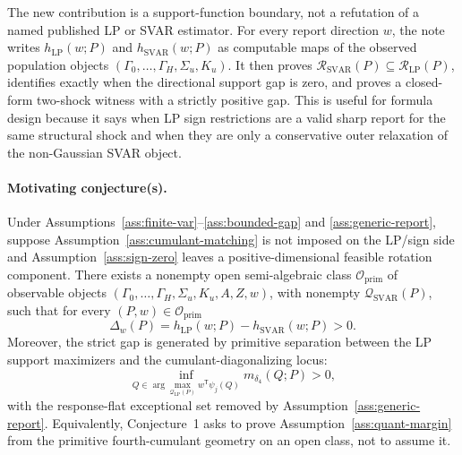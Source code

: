 \documentclass[11pt]{article}
\newcommand{\transpose}{\mathsf{T}}
\theoremstyle{definition}
\theoremstyle{plain}
\theoremstyle{remark}
\begin{document}
The new contribution is a support-function boundary, not a refutation of a
named published LP or SVAR estimator.  For every report
direction \(w\), the note writes \(h_{\mathrm{LP}}(w;P)\) and
\(h_{\mathrm{SVAR}}(w;P)\) as computable maps of the observed population
objects \((\Gamma_0,\ldots,\Gamma_H,\Sigma_u,K_u)\).  It then proves
\(\mathcal R_{\mathrm{SVAR}}(P)\subseteq \mathcal R_{\mathrm{LP}}(P)\),
identifies exactly when the directional support gap is zero, and proves a
closed-form two-shock witness with a strictly positive gap.  This is useful for
formula design because it says when LP sign restrictions are a valid sharp
report for the same structural shock and when they are only a conservative
outer relaxation of the non-Gaussian SVAR object.

\paragraph{Motivating conjecture(s).}
\begin{conjecture}\label{conj:primitive-strict-gap}
Under Assumptions~\ref{ass:finite-var}--\ref{ass:bounded-gap} and \ref{ass:generic-report}, suppose Assumption~\ref{ass:cumulant-matching} is not imposed on the LP/sign side and Assumption~\ref{ass:sign-zero} leaves a positive-dimensional feasible rotation component.  There exists a nonempty open semi-algebraic class \(\mathcal O_{\mathrm{prim}}\) of observable objects \((\Gamma_0,\ldots,\Gamma_H,\Sigma_u,K_u,A,Z,w)\), with nonempty \(\mathcal Q_{\mathrm{SVAR}}(P)\), such that for every \((P,w)\in\mathcal O_{\mathrm{prim}}\)
\[
\Delta_w(P)=h_{\mathrm{LP}}(w;P)-h_{\mathrm{SVAR}}(w;P)>0.
\]
Moreover, the strict gap is generated by primitive separation between the LP support maximizers and the cumulant-diagonalizing locus:
\[
\inf_{Q\in\arg\max_{\mathcal Q_{\mathrm{LP}}(P)} w^\transpose\psi_j(Q)}
m_{\delta_4}(Q;P)>0,
\]
with the response-flat exceptional set removed by Assumption~\ref{ass:generic-report}.  Equivalently, Conjecture~1 asks to prove Assumption~\ref{ass:quant-margin} from the primitive fourth-cumulant geometry on an open class, not to assume it.
\end{conjecture}
\end{document}
